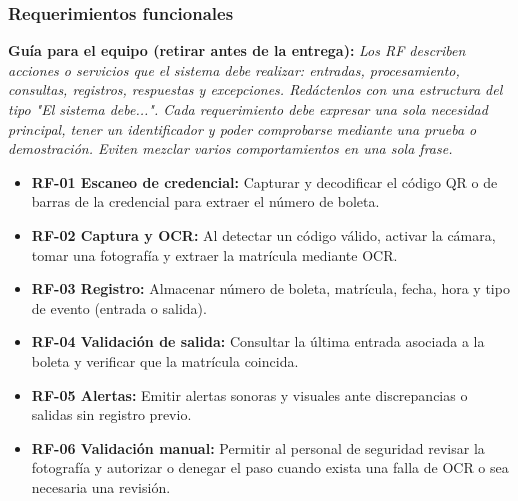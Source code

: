 \documentclass[12pt,letterpaper]{article}
\newcommand{\guia}[1]{\par\smallskip\noindent\textbf{Guía para el equipo (retirar antes de la entrega):} \textit{#1}\par\smallskip}
\begin{document}
\subsubsection{Requerimientos funcionales}
\guia{Los RF describen acciones o servicios que el sistema debe realizar: entradas, procesamiento, consultas, registros, respuestas y excepciones. Redáctenlos con una estructura del tipo "El sistema debe...". Cada requerimiento debe expresar una sola necesidad principal, tener un identificador y poder comprobarse mediante una prueba o demostración. Eviten mezclar varios comportamientos en una sola frase.}
\begin{itemize}
\item \textbf{RF-01 Escaneo de credencial:} Capturar y decodificar el código QR o de barras de la credencial para extraer el número de boleta.
\item \textbf{RF-02 Captura y OCR:} Al detectar un código válido, activar la cámara, tomar una fotografía y extraer la matrícula mediante OCR.
\item \textbf{RF-03 Registro:} Almacenar número de boleta, matrícula, fecha, hora y tipo de evento (entrada o salida).
\item \textbf{RF-04 Validación de salida:} Consultar la última entrada asociada a la boleta y verificar que la matrícula coincida.
\item \textbf{RF-05 Alertas:} Emitir alertas sonoras y visuales ante discrepancias o salidas sin registro previo.
\item \textbf{RF-06 Validación manual:} Permitir al personal de seguridad revisar la fotografía y autorizar o denegar el paso cuando exista una falla de OCR o sea necesaria una revisión.
\end{itemize}
\end{document}

